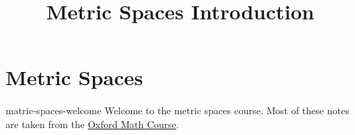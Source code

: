 \documentclass[preview]{standalone}
\begin{document}
\title{Metric Spaces Introduction}
\genpage

\section{Metric Spaces}

\begin{snippet}{matric-spaces-welcome}
Welcome to the metric spaces course.
Most of these notes are taken from the
\href{https://courses.maths.ox.ac.uk/course/view.php?id=1045}{Oxford Math Course}.
\end{snippet}
\end{document}
